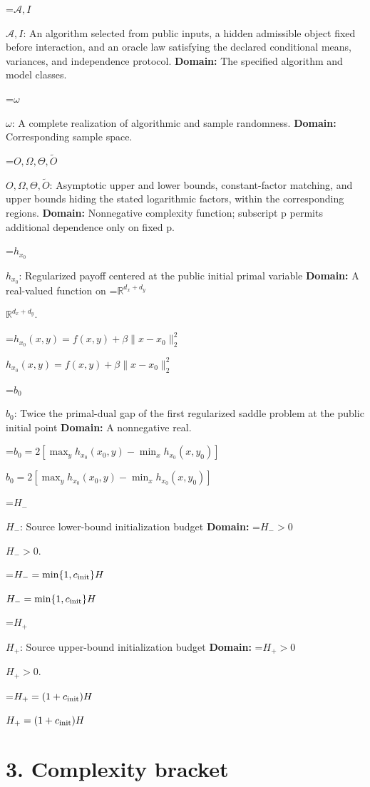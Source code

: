 \documentclass[10pt,a4paper]{article}
\newcommand{\AtlasMath}[1]{\par\begingroup\centering\setbox0=\hbox{$\displaystyle #1$}\ifdim\wd0>1.4\linewidth\typeout{ATLAS WIDE FORMULA: \the\wd0}\fi\ifdim\wd0>\linewidth\resizebox{\linewidth}{!}{\box0}\else\box0\fi\par\endgroup}
\newcommand{\AtlasInlineMath}[1]{\begingroup\setbox0=\hbox{$#1$}\ifdim\wd0>.4\linewidth\endgroup\AtlasMath{#1}\else\endgroup$#1$\fi}
\begin{document}
\AtlasInlineMath{\mathcal A,I}: An algorithm selected from public inputs, a hidden admissible object fixed before interaction, and an oracle law satisfying the declared conditional means, variances, and independence protocol. \textbf{Domain:} The specified algorithm and model classes.



\AtlasInlineMath{\omega}: A complete realization of algorithmic and sample randomness. \textbf{Domain:} Corresponding sample space.



\AtlasInlineMath{O,\Omega,\Theta,\widetilde O}: Asymptotic upper and lower bounds, constant-factor matching, and upper bounds hiding the stated logarithmic factors, within the corresponding regions. \textbf{Domain:} Nonnegative complexity function; subscript p permits additional dependence only on fixed p.



\AtlasInlineMath{h_{x_0}}: Regularized payoff centered at the public initial primal variable \textbf{Domain:} A real-valued function on \AtlasInlineMath{\mathbb R^{d_x+d_y}}.



\AtlasInlineMath{h_{x_0}(x,y)=f(x,y)+\beta\|x-x_0\|_2^2}



\AtlasInlineMath{b_0}: Twice the primal-dual gap of the first regularized saddle problem at the public initial point \textbf{Domain:} A nonnegative real.



\AtlasInlineMath{b_0=2[\max_y h_{x_0}(x_0,y)-\min_x h_{x_0}(x,y_0)]}



\AtlasInlineMath{H_-}: Source lower-bound initialization budget \textbf{Domain:} \AtlasInlineMath{H_->0}.



\AtlasInlineMath{H_-=\min\{1,c_{\rm init}\}H}



\AtlasInlineMath{H_+}: Source upper-bound initialization budget \textbf{Domain:} \AtlasInlineMath{H_+>0}.



\AtlasInlineMath{H_+=(1+c_{\rm init})H}



\section{3. Complexity bracket}
\end{document}
